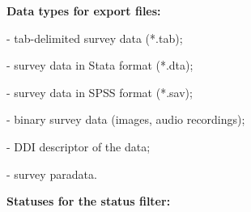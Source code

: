 \textbf{Data types for export files:}
\begin{compactitem}
    \item {} - tab-delimited survey data (*.tab);
    \item {} - survey data in Stata format (*.dta);
    \item {} - survey data in SPSS format (*.sav);
    \item {} - binary survey data (images, audio recordings);
    \item {} - DDI descriptor of the data;
    \item {} - survey paradata.
\end{compactitem}

\par
\vskip24pt
\textbf{Statuses for the status filter:}
\begin{compactitem}
    \item {}
    \item {}
    \item {}
    \item {}
    \item {}
\end{compactitem}
